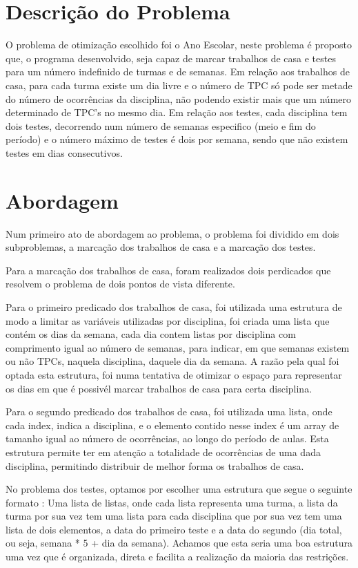 \documentclass{llncs}
\begin{document}
\section{Descrição do Problema}
%
O problema de otimização escolhido foi o Ano Escolar, neste problema é proposto que, o programa desenvolvido, seja capaz de marcar trabalhos de casa e testes para um número indefinido de turmas e de semanas. Em relação aos trabalhos de casa, para cada turma existe um dia livre e o número de TPC só pode ser metade do número de ocorrências da disciplina, não podendo existir mais que um número determinado de TPC's no mesmo dia. Em relação aos testes, cada disciplina tem dois testes, decorrendo num número de semanas especifico (meio e fim do período) e o número máximo de testes é dois por semana, sendo que não existem testes em dias consecutivos.

\section{Abordagem}
%
Num primeiro ato de abordagem ao problema, o problema foi dividido em dois subproblemas, a marcação dos trabalhos de casa e a marcação dos testes.

Para a marcação dos trabalhos de casa, foram realizados dois perdicados que resolvem o problema de dois pontos de vista diferente.

Para o primeiro predicado dos trabalhos de casa, foi utilizada uma estrutura de modo a limitar as variáveis utilizadas por disciplina, foi criada uma lista que contém os dias da semana, cada dia contem listas por disciplina com comprimento igual ao número de semanas, para indicar, em que semanas existem ou não TPCs, naquela disciplina, daquele dia da semana. A razão pela qual foi optada esta  estrutura, foi numa tentativa de otimizar o espaço para representar os dias em que é possivél marcar trabalhos de casa para certa disciplina.
\newline

Para o segundo predicado dos trabalhos de casa, foi utilizada uma lista, onde cada index, indica a disciplina, e o elemento contido nesse index é um array de tamanho igual ao número de ocorrências, ao longo do período de aulas. Esta estrutura permite ter em atenção a totalidade de ocorrências de uma dada disciplina, permitindo distribuir de melhor forma os trabalhos de casa.
\newline

No problema dos testes, optamos  por escolher uma estrutura que segue o seguinte formato : Uma lista de listas, onde cada lista representa uma turma, a lista da turma por sua vez tem uma lista para cada disciplina que por sua vez tem uma lista de dois elementos, a data do primeiro teste e a data do segundo (dia total, ou seja, semana * 5 + dia da semana). Achamos que esta seria uma boa estrutura uma vez que é organizada, direta e facilita a realização da maioria das restrições.
\end{document}
